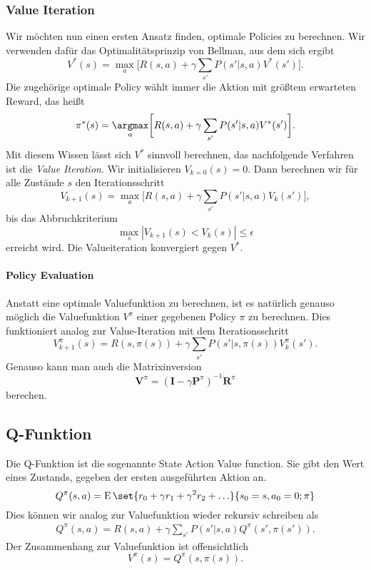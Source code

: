 \documentclass[ngerman]{../LaTeX-Templates/Paper/paper}
\newcommand{\E}{\ensuremath{\operatorname{E}}}
\begin{document}
\subsubsection{Value Iteration}
Wir möchten nun einen ersten Ansatz finden, optimale Policies zu berechnen.
Wir verwenden dafür das Optimalitätsprinzip von Bellman, aus dem sich ergibt
\begin{equation*}
	V^\ast(s)=\max_a\bigg[R(s,a)+\gamma\sum_{s'}P(s'|s,a)V^\ast(s')\bigg].
\end{equation*}
Die zugehörige optimale Policy wählt immer die Aktion mit größtem erwarteten Reward, das heißt
\begin{equation*}
	\pi^\ast(s)=\underset a\argmax \bigg[R(s,a)+\gamma\sum_{s'}P(s'|s,a)V^\ast(s')\bigg].
\end{equation*}
Mit diesem Wissen lässt sich $V^\ast$ sinnvoll berechnen, das nachfolgende Verfahren ist die \emph{Value Iteration}.
Wir initialisieren $V_{k=0}(s)=0$. Dann berechnen wir für alle Zustände $s$ den Iterationsschritt
\begin{equation*}
	V_{k+1}(s)=\max_a\bigg[R(s,a)+\gamma\sum_{s'}P(s'|s,a)V_k(s')\bigg],
\end{equation*} 
bis das Abbruchkriterium
\begin{equation*}
	\max_s|V_{k+1}(s)<V_k(s)|\leq \epsilon
\end{equation*}
erreicht wird.
Die Valueiteration konvergiert gegen $V^\ast$.

\paragraph{Policy Evaluation}\label{policyEvaluation}
Anstatt eine optimale Valuefunktion zu berechnen, ist es natürlich genauso möglich die Valuefunktion $V^\pi$ einer gegebenen Policy $\pi$ zu berechnen. Dies funktioniert analog zur Value-Iteration mit dem Iterationsschritt
\begin{equation*}
	V_{k+1}^\pi(s)=R(s,\pi(s))+\gamma\sum_{s'}P(s'|s,\pi(s))V_k^\pi(s').
\end{equation*}
Genauso kann man auch die Matrixinversion
\begin{equation*}
	\mathbf V^\pi=(\mathbf I-\gamma\mathbf P^\pi)^{-1}\mathbf R^\pi
\end{equation*}
berechen.

\subsection{Q-Funktion}
Die Q-Funktion ist die sogenannte State Action Value function. Sie gibt den Wert eines Zustands, gegeben der ersten ausgeführten Aktion an.
\begin{equation*}
	Q^\pi(s,a)=\E\set{r_0+\gamma r_1+\gamma^2 r_2+\ldots}{s_0=s,a_0=0;\pi}
\end{equation*}
Dies können wir analog zur Valuefunktion wieder rekursiv schreiben als
\begin{align*}
	Q^\pi(s,a)=R(s,a)+\gamma\sum_{s'}P(s'|s,a)Q^\pi(s',\pi(s')).
\end{align*}
Der Zusammenhang zur Valuefunktion ist offensichtlich
\begin{equation*}
	V^\pi(s)=Q^\pi(s,\pi(s)).
\end{equation*}
\end{document}
